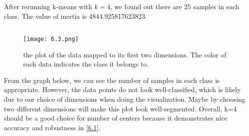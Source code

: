 \documentclass{article}
\begin{document}
    \subsection{}\label{6.2}
        After rerunning k-means with $k=4$, we found out there are 25 samples in each class.
        The value of inertia is 4844.925817623823.

    \subsection{}\label{6.3}
    \begin{figure}[hbt!]
        \centering
        \caption{the plot of the data mapped to its first two dimensions. 
        The color of each data indicates the class it belongs to.}
        \texttt{[image: 6.3.png]}
    \end{figure}
        
    \noindent From the graph below, we can see the number of samples in each class is appropriate.
    However, the data points do not look well-classified, which is likely due to our choice of dimensions when doing the visualization.
    Maybe by choosing two different dimensions will make this plot look well-segmented. 
    Overall, k=4 should be a good choice for number of centers because it demonstrates nice accuracy and robustness in \ref{6.1}.
\end{document}
